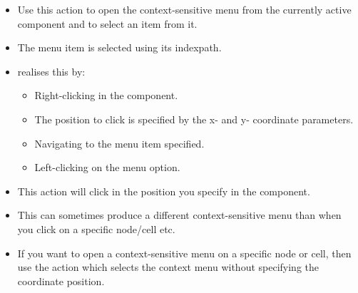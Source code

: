\begin{itemize}
\item Use this action to open the context-sensitive menu from the currently active component and to select an item from it.
\item The menu item is selected using its indexpath. 
\item \app{} realises this by:
\begin{itemize}
\item Right-clicking in the component.
\item The position to click is specified by the x- and y- coordinate parameters.
\item Navigating to the menu item specified.
\item Left-clicking on the menu option.  
\end{itemize}
\item This action will click in the position you specify in the component.
\item This can sometimes produce a different context-sensitive menu than when you click on a specific node/cell etc.
\item If you want to open a context-sensitive menu on a specific node or cell, then use the action which selects the context menu without specifying the coordinate position.

\end{itemize}

